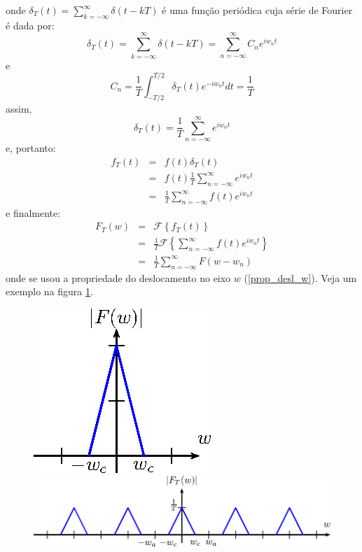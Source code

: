 onde $\delta_T(t)=\sum_{k=-\infty}^\infty \delta (t-kT)$ é uma função periódica cuja série de Fourier é dada por:
\begin{equation}\delta_T(t)=\sum_{k=-\infty}^\infty \delta (t-kT)=\sum_{n=-\infty}^\infty C_n e^{iw_n t}\end{equation}
e
\begin{equation}C_n=\frac{1}{T}\int_{-T/2}^{T/2}\delta_T(t) e^{-iw_n t}dt=\frac{1}{T}\end{equation}
assim,
\begin{equation}\delta_T(t)=\frac{1}{T}\sum_{n=-\infty}^\infty  e^{iw_n t}\end{equation}
e, portanto:
\begin{eqnarray*}
f_T(t)&=&f(t)\delta_T(t)\\
&=& f(t)\frac{1}{T}\sum_{n=-\infty}^\infty  e^{iw_n t}\\
&=&\frac{1}{T}\sum_{n=-\infty}^\infty f(t) e^{iw_n t}
\end{eqnarray*}
e finalmente:
\begin{eqnarray*}
F_T(w)&=&\mathcal{F}\left\{f_T(t)\right\}\\
&=&\frac{1}{T}\mathcal{F}\left\{\sum_{n=-\infty}^\infty f(t) e^{iw_n t}\right\}\\
&=&\frac{1}{T}\sum_{n=-\infty}^\infty F(w-w_n)
\end{eqnarray*}
onde se usou a propriedade do deslocamento no eixo $w$ (\ref{prop_desl_w}). Veja um exemplo na figura \ref{sinal_discreto1}.
\begin{figure}[!ht]
\begin{center}
\includegraphics[width=.2\textwidth]{cap_propriedades_transformada/pics/figura_9}\vspace{10pt}
\includegraphics[width=\textwidth]{cap_propriedades_transformada/pics/figura_10}\end{center}
\caption{\label{sinal_discreto1}}
\end{figure}
